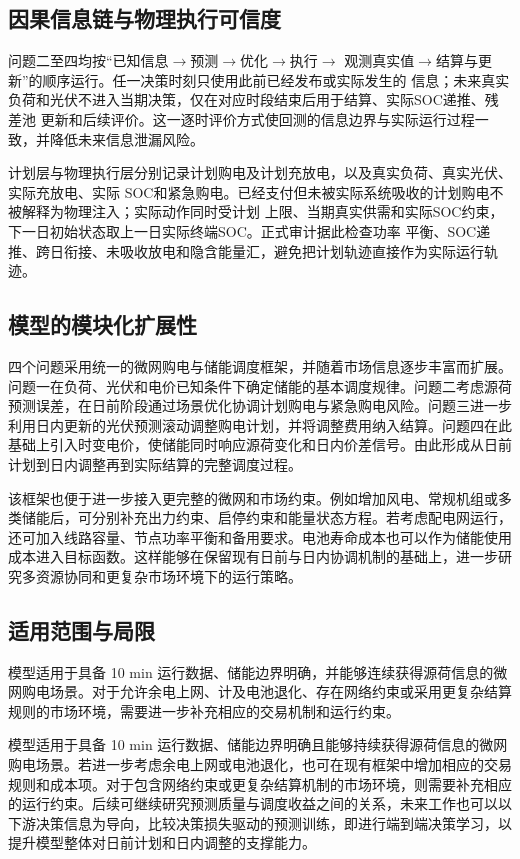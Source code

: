 \subsection{因果信息链与物理执行可信度}
问题二至四均按“已知信息$\rightarrow$预测$\rightarrow$优化$\rightarrow$执行$\rightarrow$
观测真实值$\rightarrow$结算与更新”的顺序运行。任一决策时刻只使用此前已经发布或实际发生的
信息；未来真实负荷和光伏不进入当期决策，仅在对应时段结束后用于结算、实际SOC递推、残差池
更新和后续评价。这一逐时评价方式使回测的信息边界与实际运行过程一致，并降低未来信息泄漏风险。

计划层与物理执行层分别记录计划购电及计划充放电，以及真实负荷、真实光伏、实际充放电、实际
SOC和紧急购电。已经支付但未被实际系统吸收的计划购电不被解释为物理注入；实际动作同时受计划
上限、当期真实供需和实际SOC约束，下一日初始状态取上一日实际终端SOC。正式审计据此检查功率
平衡、SOC递推、跨日衔接、未吸收放电和隐含能量汇，避免把计划轨迹直接作为实际运行轨迹。

\subsection{模型的模块化扩展性}
四个问题采用统一的微网购电与储能调度框架，并随着市场信息逐步丰富而扩展。问题一在负荷、光伏和电价已知条件下确定储能的基本调度规律。问题二考虑源荷预测误差，在日前阶段通过场景优化协调计划购电与紧急购电风险。问题三进一步利用日内更新的光伏预测滚动调整购电计划，并将调整费用纳入结算。问题四在此基础上引入时变电价，使储能同时响应源荷变化和日内价差信号。由此形成从日前计划到日内调整再到实际结算的完整调度过程。

该框架也便于进一步接入更完整的微网和市场约束。例如增加风电、常规机组或多类储能后，可分别补充出力约束、启停约束和能量状态方程。若考虑配电网运行，还可加入线路容量、节点功率平衡和备用要求。电池寿命成本也可以作为储能使用成本进入目标函数。这样能够在保留现有日前与日内协调机制的基础上，进一步研究多资源协同和更复杂市场环境下的运行策略。

\subsection{适用范围与局限}
模型适用于具备 10 min 运行数据、储能边界明确，并能够连续获得源荷信息的微网购电场景。对于允许余电上网、计及电池退化、存在网络约束或采用更复杂结算规则的市场环境，需要进一步补充相应的交易机制和运行约束。

模型适用于具备 10 min 运行数据、储能边界明确且能够持续获得源荷信息的微网购电场景。若进一步考虑余电上网或电池退化，也可在现有框架中增加相应的交易规则和成本项。对于包含网络约束或更复杂结算机制的市场环境，则需要补充相应的运行约束。后续可继续研究预测质量与调度收益之间的关系，未来工作也可以以下游决策信息为导向，比较决策损失驱动的预测训练，即进行端到端决策学习，以提升模型整体对日前计划和日内调整的支撑能力。
